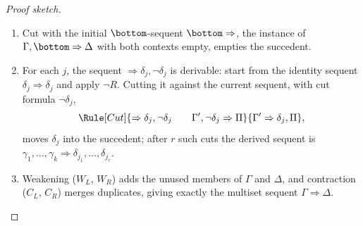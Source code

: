 \begin{proof}[Proof sketch]
\begin{enumerate}
        A finite set injects into \(\N\), so \(\Lang_S\) is countable in
        the sense of \cref{sec:set-prerequisites-05}.
        , applied to \(\Lang_S\),
        the set \(S\) and the formula \(\bottom\), gives
        \(S\derives_{\ND_{\FOL}}\bottom\) over \(\Lang_S\) with no use of
        the Axiom of Choice.  The witnessing derivation is also a
        derivation over \(\Lang\): each of its formulas is an
        \(\Lang\)-formula, and each rule instance in it remains a rule
        instance, because the rules of \(\ND_{\CPL}\) and of
        \cref{sec:fol-deduction-01} constrain only the shapes of the
        formulas involved, the free and bound variables, capture-avoiding
        substitution under the fixed variable order of
        \cref{sec:fol-syntax-semantics-04}, and alpha-equivalence, none
        of which depends on the signature.  So
        \(S\derives_{\ND_{\FOL}}\bottom\) over \(\Lang\).  The open
        assumptions of that derivation form a finite subset of \(S\), say
        \(\gamma_1,\ldots,\gamma_k\in\operatorname{supp}(\Gamma)\) and
        \(\neg\delta_{j_1},\ldots,\neg\delta_{j_r}\).  The translation
        subroutine turns it into an \(\LK_{\FOL}\)-derivation of
        \(\gamma_1,\ldots,\gamma_k,
        \neg\delta_{j_1},\ldots,\neg\delta_{j_r}\Rightarrow\bottom\).
  \item Cut with the initial \(\bottom\)-sequent
        \(\bottom\Rightarrow\), the instance of
        \(\Gamma,\bottom\Rightarrow\Delta\) with both contexts empty,
        empties the succedent.
  \item For each \(j\), the sequent
        \(\Rightarrow\delta_j,\neg\delta_j\) is derivable: start from
        the identity sequent \(\delta_j\Rightarrow\delta_j\) and apply
        \(\neg R\).  Cutting it against the current sequent, with cut
        formula \(\neg\delta_j\),
        \[
         \Rule[Cut]{\Rightarrow\delta_j,\neg\delta_j\qquad
          \Gamma',\neg\delta_j\Rightarrow\Pi}
          {\Gamma'\Rightarrow\delta_j,\Pi},
        \]
        moves \(\delta_j\) into the succedent; after \(r\) such cuts
        the derived sequent is
        \(\gamma_1,\ldots,\gamma_k\Rightarrow
        \delta_{j_1},\ldots,\delta_{j_r}\).
  \item Weakening (\(W_L\), \(W_R\)) adds the unused members of
        \(\Gamma\) and \(\Delta\), and contraction (\(C_L\),
        \(C_R\)) merges duplicates, giving exactly the multiset
        sequent \(\Gamma\Rightarrow\Delta\).
\end{enumerate}

\end{proof}
